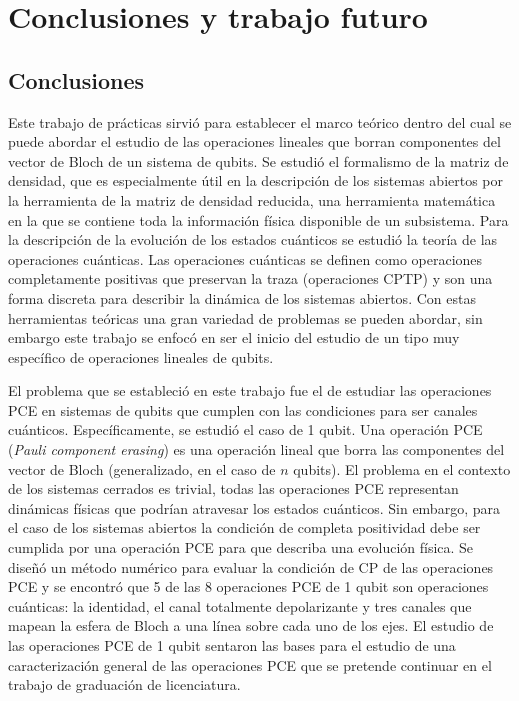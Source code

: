 \chapter{Conclusiones y trabajo futuro}
\section{Conclusiones}
Este trabajo de prácticas sirvió para establecer el marco teórico dentro del 
cual se puede abordar el estudio de las operaciones lineales que borran 
componentes del vector de Bloch de un sistema de qubits. Se estudió 
el formalismo de la matriz de densidad, que es especialmente
útil en la descripción de los sistemas abiertos por la herramienta 
de la matriz de densidad reducida, una herramienta matemática 
en la que se contiene toda la información física disponible de un subsistema. 
Para la descripción de la evolución de los estados
cuánticos se estudió la teoría de las operaciones cuánticas. Las 
operaciones cuánticas se definen como operaciones completamente
positivas que preservan la traza (operaciones CPTP) y son una 
forma discreta para describir la dinámica de los sistemas abiertos.
Con estas herramientas teóricas una gran variedad de problemas 
se pueden abordar, sin embargo este trabajo se enfocó en ser
el inicio del estudio de un tipo muy específico de operaciones lineales de qubits.

El problema que se estableció en este trabajo fue el de estudiar 
las operaciones PCE en sistemas de qubits que cumplen con las condiciones
para ser canales cuánticos. Específicamente, se estudió el caso de
1 qubit. Una operación PCE (\textit{Pauli component erasing}) es una 
operación lineal que borra las componentes del vector de Bloch 
(generalizado, en el caso de $n$ qubits). El problema en el contexto
de los sistemas cerrados es trivial, todas las operaciones PCE representan
dinámicas físicas que podrían atravesar los estados cuánticos. Sin embargo,
para el caso de los sistemas abiertos la condición de completa positividad 
debe ser cumplida por una operación PCE para que describa una evolución
física. Se diseñó un método numérico para evaluar la condición de CP 
de las operaciones PCE y se encontró que 5 de las 8 operaciones PCE 
de 1 qubit son operaciones cuánticas: la identidad, el canal totalmente
depolarizante y tres canales que mapean la esfera de Bloch a una 
línea sobre cada uno de los ejes. El estudio de las operaciones PCE 
de 1 qubit sentaron las bases para el estudio de una caracterización 
general de las operaciones PCE que se pretende continuar en el trabajo
de graduación de licenciatura.

